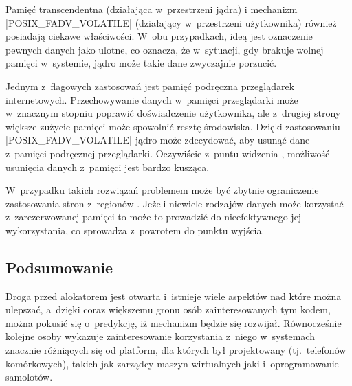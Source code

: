 Pamięć transcendentna \autocite{bib:transcendent} (działająca
w~przestrzeni jądra) i mechanizm \code|POSIX_FADV_VOLATILE|
\autocite{bib:fadv-volatile} (działający w~przestrzeni użytkownika)
również posiadają ciekawe właściwości.  W~obu przypadkach, ideą jest
oznaczenie pewnych danych jako ulotne, co oznacza, że w~sytuacji, gdy
brakuje wolnej pamięci w~systemie, jądro może takie dane zwyczajnie
porzucić.

Jednym z~flagowych zastosowań jest pamięć podręczna przeglądarek
internetowych.  Przechowywanie danych w~pamięci przeglądarki może
w~znacznym stopniu poprawić doświadczenie użytkownika, ale z~drugiej
strony większe zużycie pamięci może spowolnić resztę środowiska.
Dzięki zastosowaniu \code|POSIX_FADV_VOLATILE| jądro może zdecydować,
aby usunąć dane z~pamięci podręcznej przeglądarki.  Oczywiście z~puntu
widzenia , możliwość usunięcia danych z~pamięci jest bardzo
kusząca.

W~przypadku takich rozwiązań problemem może być zbytnie ograniczenie
zastosowania stron z~regionów .  Jeżeli niewiele rodzajów danych
może korzystać z~zarezerwowanej pamięci to może to prowadzić do
nieefektywnego jej wykorzystania, co sprowadza  z~powrotem do
punktu wyjścia.

\subsection{Podsumowanie}

Droga przed alokatorem  jest otwarta i~istnieje wiele aspektów nad
które można ulepszać, a~dzięki coraz większemu gronu osób
zainteresowanych tym kodem, można pokusić się o~predykcję, iż
mechanizm  będzie się rozwijał.  Równocześnie kolejne osoby
wykazuje zainteresowanie korzystania z~niego w~systemach znacznie
różniących się od platform, dla których był projektowany
(tj.\ telefonów komórkowych), takich jak zarządcy maszyn wirtualnych
jaki i~oprogramowanie samolotów.
